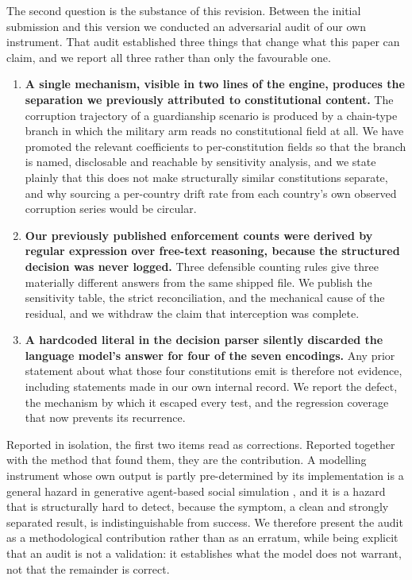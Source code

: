 \documentclass{ieeeaccess}
\begin{document}
The second question is the substance of this revision. Between the
initial submission and this version we conducted an adversarial audit of
our own instrument. That audit established three things that change what
this paper can claim, and we report all three rather than only the
favourable one.

\begin{enumerate}
\item \textbf{A single mechanism, visible in two lines of the engine,
produces the separation we previously attributed to constitutional
content.} The corruption trajectory of a guardianship scenario is
produced by a chain-type branch in which the military arm reads no
constitutional field at all. We have promoted the relevant coefficients
to per-constitution fields so that the branch is named, disclosable and
reachable by sensitivity analysis, and we state plainly that this does
not make structurally similar constitutions separate, and why sourcing a
per-country drift rate from each country's own observed corruption
series would be circular.
\item \textbf{Our previously published enforcement counts were derived
by regular expression over free-text reasoning, because the structured
decision was never logged.} Three defensible counting rules give three
materially different answers from the same shipped file. We publish the
sensitivity table, the strict reconciliation, and the mechanical cause
of the residual, and we withdraw the claim that interception was
complete.
\item \textbf{A hardcoded literal in the decision parser silently
discarded the language model's answer for four of the seven encodings.}
Any prior statement about what those four constitutions emit is
therefore not evidence, including statements made in our own internal
record. We report the defect, the mechanism by which it escaped every
test, and the regression coverage that now prevents its recurrence.
\end{enumerate}

Reported in isolation, the first two items read as corrections. Reported
together with the method that found them, they are the contribution.
A modelling instrument whose own output is partly pre-determined by its
implementation is a general hazard in generative agent-based social
simulation \cite{ziems2024can,sagallm2025}, and it is a hazard that is
structurally hard to detect, because the symptom, a clean and strongly
separated result, is indistinguishable from success. We therefore
present the audit as a methodological contribution rather than as an
erratum, while being explicit that an audit is not a validation: it
establishes what the model does not warrant, not that the remainder is
correct.
\end{document}
